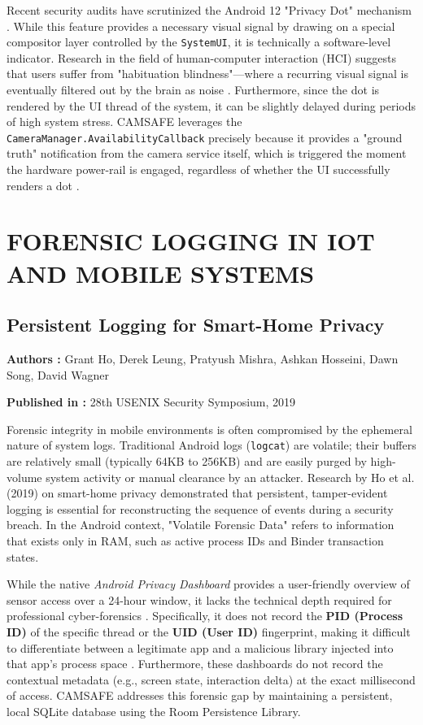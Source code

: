 \documentclass[12pt,a4paper]{report}
\begin{document}
\begin{enumerate}
    Recent security audits have scrutinized the Android 12 "Privacy Dot" mechanism \cite{privacydot}. While this feature provides a necessary visual signal by drawing on a special compositor layer controlled by the \texttt{SystemUI}, it is technically a software-level indicator. Research in the field of human-computer interaction (HCI) suggests that users suffer from "habituation blindness"—where a recurring visual signal is eventually filtered out by the brain as noise \cite{privacydot}. Furthermore, since the dot is rendered by the UI thread of the system, it can be slightly delayed during periods of high system stress. CAMSAFE leverages the \texttt{CameraManager.AvailabilityCallback} precisely because it provides a "ground truth" notification from the camera service itself, which is triggered the moment the hardware power-rail is engaged, regardless of whether the UI successfully renders a dot \cite{androidhal}.

    \section{FORENSIC LOGGING IN IOT AND MOBILE SYSTEMS}

    \subsection{Persistent Logging for Smart-Home Privacy}

    \textbf{Authors :} Grant Ho, Derek Leung, Pratyush Mishra, Ashkan Hosseini, Dawn Song, David Wagner

    \textbf{Published in :} 28th USENIX Security Symposium, 2019

    Forensic integrity in mobile environments is often compromised by the ephemeral nature of system logs. Traditional Android logs (\texttt{logcat}) are volatile; their buffers are relatively small (typically 64KB to 256KB) and are easily purged by high-volume system activity or manual clearance by an attacker. Research by Ho et al. (2019) \cite{smarthome} on smart-home privacy demonstrated that persistent, tamper-evident logging is essential for reconstructing the sequence of events during a security breach. In the Android context, "Volatile Forensic Data" refers to information that exists only in RAM, such as active process IDs and Binder transaction states.

    While the native \textit{Android Privacy Dashboard} provides a user-friendly overview of sensor access over a 24-hour window, it lacks the technical depth required for professional cyber-forensics \cite{privacydot}. Specifically, it does not record the \textbf{PID (Process ID)} of the specific thread or the \textbf{UID (User ID)} fingerprint, making it difficult to differentiate between a legitimate app and a malicious library injected into that app's process space \cite{taintdroid}. Furthermore, these dashboards do not record the contextual metadata (e.g., screen state, interaction delta) at the exact millisecond of access. CAMSAFE addresses this forensic gap by maintaining a persistent, local SQLite database using the Room Persistence Library. 

\end{enumerate}
\end{document}
